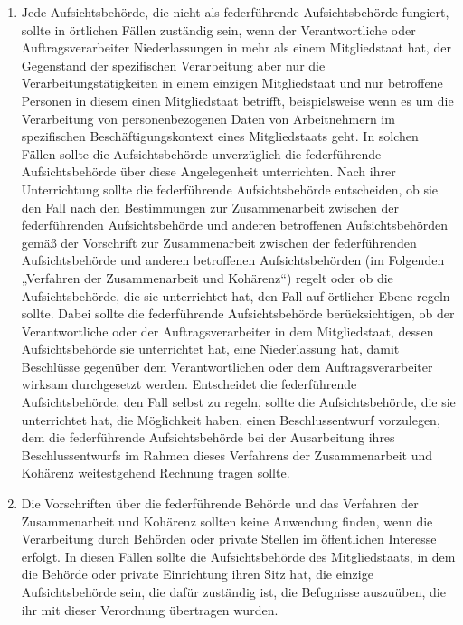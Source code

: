 \begin{enumerate}
   \item Jede Aufsichtsbehörde, die nicht als federführende Aufsichtsbehörde fungiert, sollte in örtlichen Fällen
    zuständig sein, wenn der Verantwortliche oder Auftragsverarbeiter Niederlassungen in mehr als einem Mitgliedstaat
    hat, der Gegenstand der spezifischen Verarbeitung aber nur die Verarbeitungstätigkeiten in einem einzigen
    Mitgliedstaat und nur betroffene Personen in diesem einen Mitgliedstaat betrifft, beispielsweise wenn es um die
    Verarbeitung von personenbezogenen Daten von Arbeitnehmern im spezifischen Beschäftigungskontext eines
    Mitgliedstaats geht. In solchen Fällen sollte die Aufsichtsbehörde unverzüglich die federführende Aufsichtsbehörde
    über diese Angelegenheit unterrichten. Nach ihrer Unterrichtung sollte die federführende Aufsichtsbehörde
    entscheiden, ob sie den Fall nach den Bestimmungen zur Zusammenarbeit zwischen der federführenden Aufsichtsbehörde
    und anderen betroffenen Aufsichtsbehörden gemäß der Vorschrift zur Zusammenarbeit zwischen der federführenden
    Aufsichtsbehörde und anderen betroffenen Aufsichtsbehörden (im Folgenden „Verfahren der Zusammenarbeit und
    Kohärenz“) regelt oder ob die Aufsichtsbehörde, die sie unterrichtet hat, den Fall auf örtlicher Ebene regeln
    sollte. Dabei sollte die federführende Aufsichtsbehörde berücksichtigen, ob der Verantwortliche oder der
    Auftragsverarbeiter in dem Mitgliedstaat, dessen Aufsichtsbehörde sie unterrichtet hat, eine Niederlassung hat,
    damit Beschlüsse gegenüber dem Verantwortlichen oder dem Auftragsverarbeiter wirksam durchgesetzt werden.
    Entscheidet die federführende Aufsichtsbehörde, den Fall selbst zu regeln, sollte die Aufsichtsbehörde, die sie
    unterrichtet hat, die Möglichkeit haben, einen Beschlussentwurf vorzulegen, dem die federführende Aufsichtsbehörde
    bei der Ausarbeitung ihres Beschlussentwurfs im Rahmen dieses Verfahrens der Zusammenarbeit und Kohärenz
    weitestgehend Rechnung tragen sollte.%
   \label{itm:eg-127}
   

   \item Die Vorschriften über die federführende Behörde und das Verfahren der Zusammenarbeit und Kohärenz sollten keine
    Anwendung finden, wenn die Verarbeitung durch Behörden oder private Stellen im öffentlichen Interesse erfolgt. In
    diesen Fällen sollte die Aufsichtsbehörde des Mitgliedstaats, in dem die Behörde oder private Einrichtung ihren
    Sitz hat, die einzige Aufsichtsbehörde sein, die dafür zuständig ist, die Befugnisse auszuüben, die ihr mit dieser
    Verordnung übertragen wurden.%
   \label{itm:eg-128}
   

\end{enumerate}
